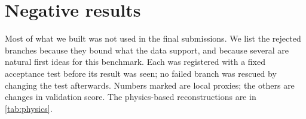 \section{Negative results}\label{sec:negative}

Most of what we built was not used in the final submissions. We list the rejected branches because they bound what the data support, and
because several are natural first ideas for this benchmark. Each was registered with a fixed acceptance test before its result
was seen; no failed branch was rescued by changing the test afterwards. Numbers marked \proxy{} are local proxies;
the others are changes in validation score. The physics-based reconstructions are in \cref{tab:physics}.

